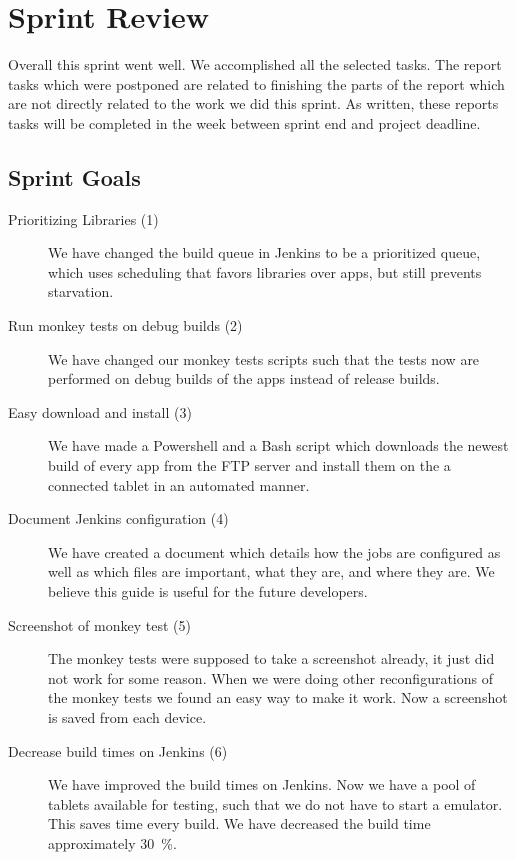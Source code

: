 \chapter{Sprint Review}\label{chap:sprint4_end}
Overall this sprint went well. We accomplished all the selected tasks. The report tasks which were postponed are related to finishing the parts of the report which are not directly related to the work we did this sprint. As written, these reports tasks will be completed in the week between sprint end and project deadline.

\section{Sprint Goals}\label{sec:s4_goals}
\begin{description}
    \item[Prioritizing Libraries (1)] We have changed the build queue in Jenkins to be a prioritized queue, which uses scheduling that favors libraries over apps, but still prevents starvation.
    \item[Run monkey tests on debug builds (2)] We have changed our monkey tests scripts such that the tests now are performed on debug builds of the apps instead of release builds.
    \item[Easy download and install (3)] We have made a Powershell and a Bash script which downloads the newest build of every app from the FTP server and install them on the a connected tablet in an automated manner.
    \item[Document Jenkins configuration (4)] We have created a document which details how the jobs are configured as well as which files are important, what they are, and where they are. We believe this guide is useful for the future developers.
    \item[Screenshot of monkey test (5)] The monkey tests were supposed to take a screenshot already, it just did not work for some reason. When we were doing other reconfigurations of the monkey tests we found an easy way to make it work. Now a screenshot is saved from each device.
    \item[Decrease build times on Jenkins (6)] We have improved the build times on Jenkins. Now we have a pool of tablets available for testing, such that we do not have to start a emulator. This saves time every build. We have decreased the build time approximately \SI{30}{\percent}.
\end{description}
